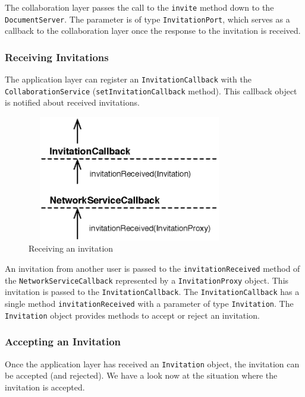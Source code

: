 The collaboration layer passes the call to the \texttt{invite} method down
to the \texttt{Document\-Server}. The parameter is of type 
\texttt{Invitation\-Port}, which serves as a callback to the collaboration layer
once the response to the invitation is received.

\subsubsection{Receiving Invitations}
The application layer can register an \texttt{Invitation\-Callback} with
the \texttt{Collaboration\-Service} (\texttt{set\-Invitation\-Callback} method).
This callback object is notified about received invitations.

\begin{figure}[H]
 \centering
 \includegraphics[width=8.96cm,height=5.50cm]{../images/finalreport/architecture_flows/invite_receive.eps}
 \caption{Receiving an invitation}
 \label{fig:archoverview.flow.invitereceive}
\end{figure}

An invitation from another user is passed to the \texttt{invitation\-Received}
method of the \texttt{Network\-Service\-Callback} represented by a
\texttt{Invitation\-Proxy} object. This invitation is passed to the
\texttt{Invitation\-Callback}. 
The \texttt{Invitation\-Callback} has a single method 
\texttt{invitation\-Received} with a parameter of type \texttt{Invitation}.
The \texttt{Invitation} object provides methods to accept or reject
an invitation.

\subsubsection{Accepting an Invitation}
Once the application layer has received an \texttt{Invitation} object, the
invitation can be accepted (and rejected). We have a look now at the situation
where the invitation is accepted.

